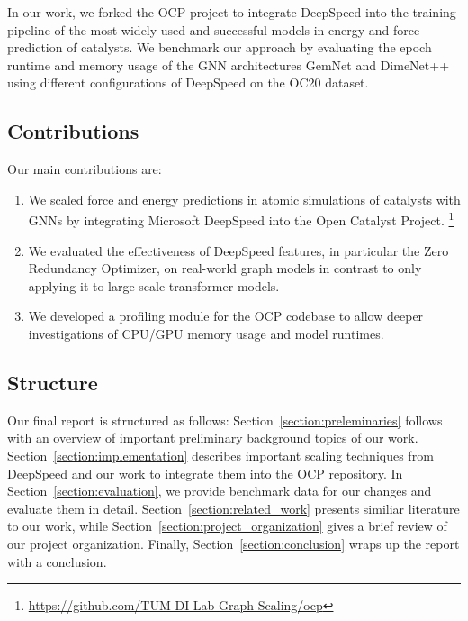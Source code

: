 In our work, we forked the OCP project to integrate DeepSpeed into the training pipeline of the most widely-used 
and successful models in energy and force prediction of catalysts. 
We benchmark our approach by evaluating the epoch runtime and memory usage of the GNN architectures GemNet and 
DimeNet++ using different configurations of DeepSpeed on the OC20 dataset.


\subsection{Contributions}

Our main contributions are:

\begin{enumerate}
    \item We scaled force and energy predictions in atomic simulations of catalysts with GNNs 
    by integrating Microsoft DeepSpeed into the Open Catalyst Project.
    \footnote{\url{https://github.com/TUM-DI-Lab-Graph-Scaling/ocp}}
    \item We evaluated the effectiveness of DeepSpeed features, in particular the Zero Redundancy Optimizer, on 
    real-world graph models in contrast to only applying it to large-scale transformer models.
    \item We developed a profiling module for the OCP codebase to allow deeper investigations of CPU/GPU memory 
    usage and model runtimes.
\end{enumerate}

\subsection{Structure}

Our final report is structured as follows: Section~\ref{section:preleminaries} follows with an overview of 
important preliminary background topics of our work. Section~\ref{section:implementation} describes important 
scaling techniques from DeepSpeed and our work to integrate them into the OCP repository. In 
Section~\ref{section:evaluation}, we provide benchmark data for our changes and evaluate them in detail. 
Section~\ref{section:related_work} presents similiar literature to our work, while Section~\ref{section:project_organization} 
gives a brief review of our project organization. Finally, Section~\ref{section:conclusion} wraps up the 
report with a conclusion.